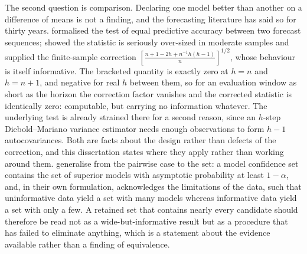 The second question is comparison. Declaring one model better than another on a
difference of means is not a finding, and the forecasting literature has said
so for thirty years. \citet{diebold_comparing_1995} formalised the test of
equal predictive accuracy between two forecast sequences;
\citet{harvey_testing_1997} showed the statistic is seriously over-sized in
moderate samples and supplied the finite-sample correction
$\left[\frac{n + 1 - 2h + n^{-1}h(h-1)}{n}\right]^{1/2}$, whose behaviour is
itself informative. The bracketed quantity is exactly zero at $h = n$ and
$h = n+1$, and negative for real $h$ between them, so for an evaluation window
as short as the horizon the correction factor vanishes and the corrected
statistic is identically zero: computable, but carrying no information
whatever. The underlying test is already strained there for a second reason,
since an $h$-step Diebold--Mariano variance estimator needs enough observations
to form $h-1$ autocovariances. Both are facts about the design rather than
defects of the correction, and this dissertation states where they apply rather
than working around them. \citet{hansen_model_2011} generalise from the
pairwise case to the set: a model confidence set contains the set of superior
models with asymptotic probability at least $1 - \alpha$, and, in their own
formulation, acknowledges the limitations of the data, such that uninformative
data yield a set with many models whereas informative data yield a set with
only a few. A retained set that contains nearly every candidate should
therefore be read not as a wide-but-informative result but as a procedure that
has failed to eliminate anything, which is a statement about the evidence
available rather than a finding of equivalence.


